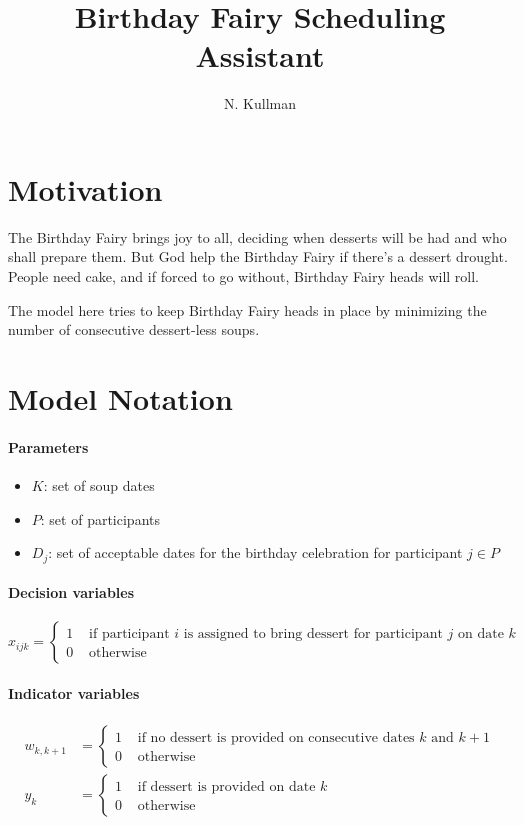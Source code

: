 \documentclass[11pt,letterpaper]{article}
\author{N. Kullman}
\title{Birthday Fairy Scheduling Assistant}
\begin{document}
\maketitle

\section*{Motivation}
The Birthday Fairy brings joy to all, deciding when desserts will be had and who shall prepare them. But God help the Birthday Fairy if there's a dessert drought. People need cake, and if forced to go without, Birthday Fairy heads will roll.

The model here tries to keep Birthday Fairy heads in place by minimizing the number of consecutive dessert-less soups.

\section*{Model Notation}
\paragraph{Parameters}
\begin{itemize}
\item $K$: set of soup dates
\item $P$: set of participants
\item $D_j$: set of acceptable dates for the birthday celebration for participant $j \in P$
\end{itemize}

\paragraph{Decision variables}
$$
x_{ijk} = \begin{cases}
1 &\text{ if participant $i$ is assigned to bring dessert for participant $j$ on date $k$}\\
0 &\text{ otherwise}
\end{cases}
$$

\paragraph{Indicator variables}
\begin{align*}
w_{k,k+1} &= \begin{cases}
1 &\text{ if no dessert is provided on consecutive dates $k$ and $k+1$}\\
0 &\text{ otherwise}
\end{cases}
\\
y_{k} &= \begin{cases}
1 &\text{ if dessert is provided on date $k$}\\
0 &\text{ otherwise}
\end{cases}
\end{align*}
\end{document}
